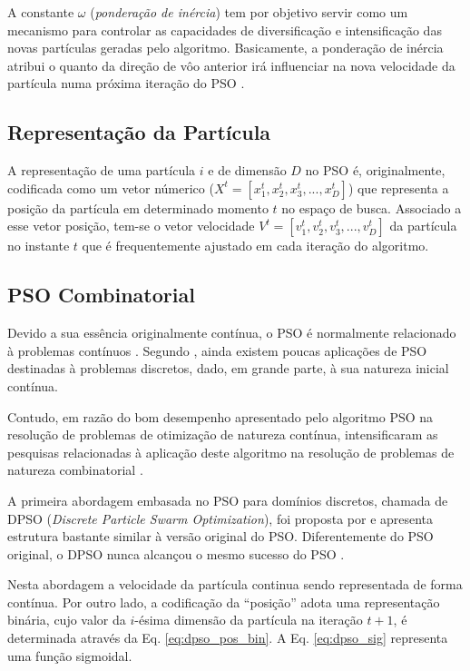\documentclass[
	12pt,				%
	openany,			%
	oneside,	
	a4paper,			%
	brazil,				%
	]{unimontes-ppgmsc-abntex2}
\begin{document}
A constante $\omega$ ({\em ponderação de inércia}) tem por objetivo servir como um mecanismo para controlar as capacidades de diversificação e intensificação das novas partículas geradas pelo algoritmo. Basicamente, a ponderação de inércia atribui o quanto da direção de vôo anterior irá influenciar na nova velocidade da partícula numa próxima iteração do PSO \cite{Rini_2011}.

\subsection{Representação da Partícula}
\label{sec:repr_part}

A representação de uma partícula $i$ e de dimensão $D$ no PSO é, originalmente, codificada como um vetor númerico ($X^t =[x^t_1, x^t_2, x^t_3, ... ,x^t_D]$) que representa a posição da partícula  em determinado momento $t$ no espaço de busca. Associado a esse vetor posição, tem-se o vetor velocidade $V^t =[v^t_1, v^t_2, v^t_3, ... , v^t_D]$ da partícula no instante $t$ que é frequentemente ajustado em cada iteração do algoritmo.

\subsection{PSO Combinatorial}
\label{sec:pso_discretos}

Devido a sua essência originalmente contínua, o PSO é normalmente relacionado à problemas contínuos \cite{Kennedy_1997}. Segundo , ainda existem poucas aplicações de PSO destinadas à problemas discretos, dado, em grande parte, à sua natureza inicial contínua. 

Contudo, em razão do bom desempenho apresentado pelo algoritmo PSO na resolução de problemas de otimização de natureza contínua, intensificaram as pesquisas relacionadas à aplicação deste algoritmo na resolução de problemas de natureza combinatorial \cite{Wang2_2011}. 

A primeira abordagem embasada no PSO para domínios discretos, chamada de DPSO (\textit{Discrete Particle Swarm Optimization}), foi proposta por  e apresenta estrutura bastante similar à versão original do PSO. Diferentemente do PSO original, o DPSO nunca alcançou o mesmo sucesso do PSO \cite{Hoffmann_2011}. 

Nesta abordagem a velocidade da partícula continua sendo representada de forma contínua. Por outro lado, a codificação da ``posição'' adota uma representação binária, cujo valor da $i$-ésima dimensão da partícula na iteração $t+1$, é determinada através da Eq. \ref{eq:dpso_pos_bin}. A Eq. \ref{eq:dpso_sig} representa uma função sigmoidal.
\end{document}
